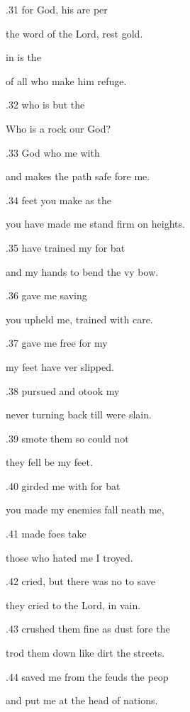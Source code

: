 .31  for God, his  are per 

the word of the Lord, rest gold. 

 in is the  

of all who make him  refuge. 

.32  who is  but the  

Who is a rock  our God? 

.33  God who  me with  

and makes the path safe fore me. 

.34  feet you make  as the  

you have made me stand firm on  heights. 

.35  have trained my  for bat 

and my hands to bend the vy bow. 

.36  gave me  saving  

you upheld me, trained  with care. 

.37  gave me free for my  

my feet have ver slipped. 

.38  pursued and otook my  

never turning back till  were slain. 

.39  smote them so  could not  

they fell be my feet. 

.40  girded me with  for bat 

you made my enemies fall neath me, 

.41  made  foes take  

those who hated me I troyed. 

.42  cried, but there was no  to save  

they cried to the Lord,  in vain. 

.43  crushed them fine as dust fore the  

trod them down like dirt  the streets. 

.44  saved me from the feuds  the peop 

and put me at the head of  nations. 

